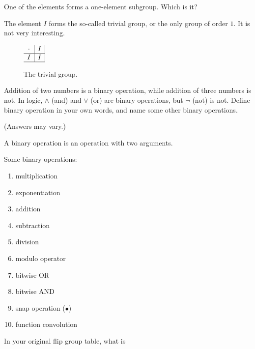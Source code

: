 \documentclass[../gatm_answers.tex]{subfiles}
\begin{document}
\begin{outer_problem}
\item One of the elements forms a one-element subgroup. Which is it?
\end{outer_problem}

The element $I$ forms the so-called trivial group, or the only group of order $1$. It is not very interesting.
\begin{figure}[h]
\begin{center}
$\begin{array}{c|c|}
\cdot & I \\ \hline
I & I \\ \hline
\end{array}$
\caption{The trivial group.}
\label{fig:trivial_group}
\end{center}
\end{figure}

\begin{outer_problem}
\item Addition of two numbers is a binary operation, while addition of three numbers is not. In logic, $\land$ (and) and $\lor$ (or) are binary operations, but $\lnot$ (not) is not. Define binary operation in your own words, and name some other binary operations.
\end{outer_problem}

(Answers may vary.)

A binary operation is an operation with two arguments.

Some binary operations:
\begin{multicols}{4}
\begin{enumerate}
\item multiplication
\item exponentiation
\item addition
\item subtraction
\item division
\item modulo operator
\item bitwise OR
\item bitwise AND
\item snap operation ($\bullet$)
\item function convolution
\end{enumerate}
\end{multicols}

\begin{outer_problem}
\item In your original flip group table, what is
\end{outer_problem}
\end{document}
